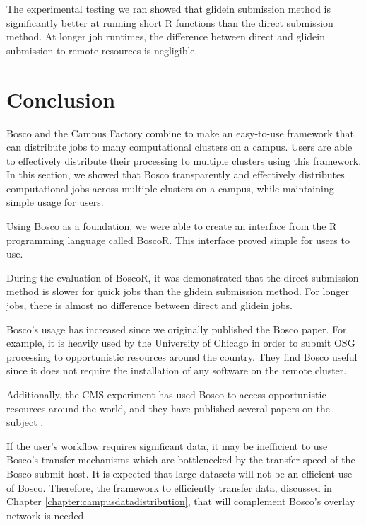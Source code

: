 The experimental testing we ran showed that glidein submission method is significantly better at running short R functions than the direct submission method.  At longer job runtimes, the difference between direct and glidein submission to remote resources is negligible.






\section{Conclusion}

Bosco and the Campus Factory combine to make an easy-to-use framework that can distribute jobs to many computational clusters on a campus.  Users are able to effectively distribute their processing to multiple clusters using this framework.  In this section, we showed that Bosco transparently and effectively distributes computational jobs across multiple clusters on a campus, while maintaining simple usage for users.

Using Bosco as a foundation, we were able to create an interface from the R programming language called BoscoR.  This interface proved simple for users to use.  

During the evaluation of BoscoR, it was demonstrated that the direct submission method is slower for quick jobs than the glidein submission method.  For longer jobs, there is almost no difference between direct and glidein jobs.

Bosco's usage has increased since we originally published the Bosco paper.  For example, it is heavily used by the University of Chicago in order to submit OSG processing to opportunistic resources around the country.  They find Bosco useful since it does not require the installation of any software on the remote cluster.

Additionally, the CMS experiment has used Bosco to access opportunistic resources around the world, and they have published several papers on the subject \cite{hufnagelcmsopportunistic, piperovoperationalchep15, wagner2013using, kreuzer2014opportunistic}.

If the user's workflow requires significant data, it may be inefficient to use Bosco's transfer mechanisms which are bottlenecked by the transfer speed of the Bosco submit host.  It is expected that large datasets will not be an efficient use of Bosco.  Therefore, the framework to efficiently transfer data, discussed in Chapter \ref{chapter:campusdatadistribution}, that will complement Bosco's overlay network is needed.



